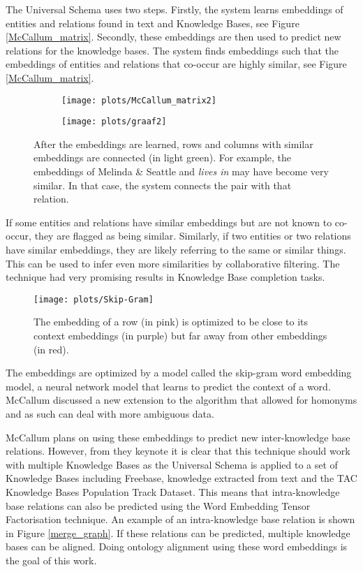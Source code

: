 \documentclass{article}
\begin{document}
The Universal Schema uses two steps. Firstly, the system learns embeddings of entities and relations found in text and Knowledge Bases\cite{univeralschema}, see Figure \ref{McCallum_matrix}. Secondly, these embeddings are then used to predict new relations for the knowledge bases. The system finds embeddings such that the embeddings of entities and relations that co-occur are highly similar, see Figure \ref{McCallum_matrix}.

 \begin{figure}[H]
 \begin{subfigure}{0.475\textwidth}
 \texttt{[image: plots/McCallum\_matrix2]}
 \end{subfigure}
 \begin{subfigure}{0.475\textwidth}
 \texttt{[image: plots/graaf2]}
 \end{subfigure}
 \caption{After the embeddings are learned, rows and columns with similar embeddings are connected (in light green).
 For example, the embeddings of Melinda \& Seattle and \emph{lives in} may have become very similar. In that case, the system connects the pair with that relation.}
 \label{McCallum_matrix2}
 \end{figure}
 
 If some entities and relations have similar embeddings but are not known to co-occur, they are flagged as being similar. Similarly, if two entities or two relations have similar embeddings, they are likely referring to the same or similar things. This can be used to infer even more similarities by collaborative filtering. The technique had very promising results in Knowledge Base completion tasks.
  
 \begin{figure}[H]
 \centering
 \texttt{[image: plots/Skip-Gram]}
 \label{Skip-Gram-img}
 \caption{The embedding of a row (in pink) is optimized to be close to its context embeddings (in purple) but far away from other embeddings (in red).}
 \end{figure}
 
 The embeddings are optimized by a model called the skip-gram word embedding model\cite{w2v}, a neural network model that learns to predict the context of a word. McCallum discussed a new extension to the algorithm that allowed for homonyms and as such can deal with more ambiguous data\cite{mccallumweblecture}.
 
 McCallum plans on using these embeddings to predict new inter-knowledge base relations. However, from they keynote it is clear that this technique should work with multiple Knowledge Bases as the Universal Schema is applied to a set of Knowledge Bases including Freebase, knowledge extracted from text and the TAC Knowledge Bases Population Track Dataset. This means that intra-knowledge base relations can also be predicted using the Word Embedding Tensor Factorisation technique.
 An example of an intra-knowledge base relation is shown in Figure \ref{merge_graph}. If these relations can be predicted, multiple knowledge bases can be aligned. Doing ontology alignment using these word embeddings is the goal of this work.
 
\end{document}
